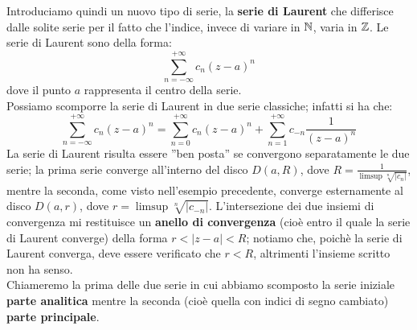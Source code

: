 Introduciamo quindi un nuovo tipo di serie, la \textbf{serie di Laurent} che differisce dalle solite serie per il fatto che l'indice, invece di variare in $\mathbb{N}$, varia in $\mathbb{Z}$. Le serie di Laurent sono della forma:
$$\sum_{n=-\infty} ^{+\infty} c_n (z-a)^n$$
 dove il punto $a$ rappresenta il centro della serie. \\ Possiamo scomporre la serie di Laurent in due serie classiche; infatti si ha che:
 $$\sum_{n=-\infty} ^{+\infty} c_n (z-a)^n=\sum_{n=0} ^{+\infty} c_n (z-a)^n + \sum_{n=1} ^{+\infty} c_{-n} \frac{1}{(z-a)^n}$$
La serie di Laurent risulta essere ''ben posta'' se convergono separatamente le due serie; la prima serie converge all'interno del disco $D(a,R)$, dove $R=\frac{1}{\limsup \sqrt[n]{|c_n|}}$, mentre la seconda, come visto nell'esempio precedente, converge esternamente al disco $D(a,r)$, dove $r=\limsup \sqrt[n]{|c_{-n}|}$. L'intersezione dei due insiemi di convergenza mi restituisce un \textbf{anello di convergenza} (cioè entro il quale la serie di Laurent converge) della forma $r<|z-a|<R$; notiamo che, poichè la serie di Laurent converga, deve essere verificato che $r<R$, altrimenti l'insieme scritto non ha senso.
\\Chiameremo la prima delle due serie in cui abbiamo scomposto la serie iniziale \textbf{parte analitica} mentre la seconda (cioè quella con indici di segno cambiato) \textbf{parte principale}.

